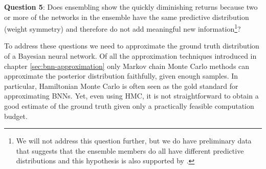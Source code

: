 \documentclass[../thesis.tex]{subfiles}
\begin{document}
\noindent \textbf{Question 5}: Does ensembling show the quickly diminishing returns because two or more of the networks in the ensemble have the same predictive distribution (weight symmetry) and therefore do not add meaningful new information\footnote{We will not address this question further, but we do have preliminary data that suggests that the ensemble members do all have different predictive distributions and this hypothesis is also supported by \textcite{fort2019deep}.}?
\medskip

To address these questions we need to approximate the ground truth distribution of a Bayesian neural network. Of all the approximation techniques introduced in chapter \ref{sec:bnn-approximation} only Markov chain Monte Carlo methods can approximate the posterior distribution faithfully, given enough samples. In particular, Hamiltonian Monte Carlo is often seen as the gold standard for approximating BNNs. Yet, even using HMC, it is not straightforward to obtain a good estimate of the ground truth given only a practically feasible computation budget.
\end{document}
